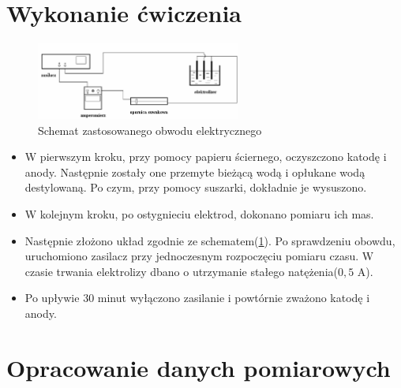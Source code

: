 \documentclass [a4paper,11pt]{article}
\begin{document}
	\section{Wykonanie ćwiczenia}
	\begin{figure}[!h]
		\centering
		\includegraphics[width=0.6\textwidth]{uklad}
		\caption{Schemat zastosowanego obwodu elektrycznego}
		\label{fig:uklad}
	\end{figure}
	\begin{itemize}
		\item W pierwszym kroku, przy pomocy papieru ściernego, oczyszczono katodę i anody. Następnie zostały one przemyte bieżącą wodą i opłukane wodą destylowaną. Po czym, przy pomocy suszarki, dokładnie je wysuszono.
		
		\item W kolejnym kroku, po ostygnieciu elektrod, dokonano pomiaru ich mas.
		
		\item Następnie złożono układ zgodnie ze schematem(\ref{fig:uklad}). Po sprawdzeniu obowdu, uruchomiono zasilacz przy jednoczesnym rozpoczęciu pomiaru czasu.
		W czasie trwania elektrolizy dbano o utrzymanie stałego natężenia($0,5$ A).
		
		\item  Po upływie 30 minut wyłączono zasilanie i powtórnie zważono katodę i anody.
	\end{itemize}

	
	\section{Opracowanie danych pomiarowych}\label{sec:opr}
\end{document}
